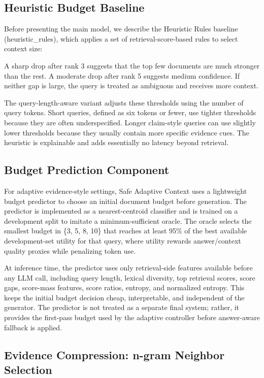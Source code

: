 \documentclass[11pt]{article}
\begin{document}
\subsection{Heuristic Budget Baseline}

Before presenting the main model, we describe the Heuristic Rules baseline (heuristic\_rules), which applies a set of retrieval-score-based rules to select context size:


A sharp drop after rank 3 suggests that the top few documents are much stronger than the rest. A moderate drop after rank 5 suggests medium confidence. If neither gap is large, the query is treated as ambiguous and receives more context.


The query-length-aware variant adjusts these thresholds using the number of query tokens. Short queries, defined as six tokens or fewer, use tighter thresholds because they are often underspecified. Longer claim-style queries can use slightly lower thresholds because they usually contain more specific evidence cues. The heuristic is explainable and adds essentially no latency beyond retrieval.


\subsection{Budget Prediction Component}

For adaptive evidence-style settings, Safe Adaptive Context uses a lightweight budget predictor to choose an initial document budget before generation. The predictor is implemented as a nearest-centroid classifier and is trained on a development split to imitate a minimum-sufficient oracle. The oracle selects the smallest budget in \{3, 5, 8, 10\} that reaches at least 95\% of the best available development-set utility for that query, where utility rewards answer/context quality proxies while penalizing token use.


At inference time, the predictor uses only retrieval-side features available before any LLM call, including query length, lexical diversity, top retrieval scores, score gaps, score-mass features, score ratios, entropy, and normalized entropy. This keeps the initial budget decision cheap, interpretable, and independent of the generator. The predictor is not treated as a separate final system; rather, it provides the first-pass budget used by the adaptive controller before answer-aware fallback is applied.


\subsection{Evidence Compression: n-gram Neighbor Selection}
\end{document}
